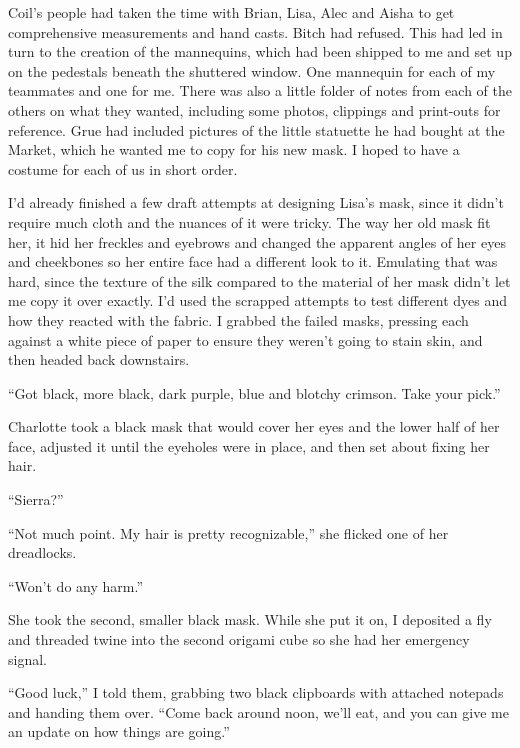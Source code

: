 Coil's people had taken the time with Brian, Lisa, Alec and Aisha to get comprehensive measurements and hand casts.  Bitch had refused.  This had led in turn to the creation of the mannequins, which had been shipped to me and set up on the pedestals beneath the shuttered window.  One mannequin for each of my teammates and one for me.  There was also a little folder of notes from each of the others on what they wanted, including some photos, clippings and print-outs for reference.  Grue had included pictures of the little statuette he had bought at the Market, which he wanted me to copy for his new mask. I hoped to have a costume for each of us in short order.



I'd already finished a few draft attempts at designing Lisa's mask, since it didn't require much cloth and the nuances of it were tricky.  The way her old mask fit her, it hid her freckles and eyebrows and changed the apparent angles of her eyes and cheekbones so her entire face had a different look to it.  Emulating that was hard, since the texture of the silk compared to the material of her mask didn't let me copy it over exactly.  I'd used the scrapped attempts to test different dyes and how they reacted with the fabric.  I grabbed the failed masks, pressing each against a white piece of paper to ensure they weren't going to stain skin, and then headed back downstairs.



``Got black, more black, dark purple, blue and blotchy crimson.  Take your pick.''



Charlotte took a black mask that would cover her eyes and the lower half of her face, adjusted it until the eyeholes were in place, and then set about fixing her hair.



``Sierra?''



``Not much point.  My hair is pretty recognizable,'' she flicked one of her dreadlocks.



``Won't do any harm.''



She took the second, smaller black mask.  While she put it on, I deposited a fly and threaded twine into the second origami cube so she had her emergency signal.



``Good luck,'' I told them, grabbing two black clipboards with attached notepads and handing them over.  ``Come back around noon, we'll eat, and you can give me an update on how things are going.''



